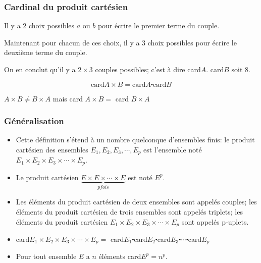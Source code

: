 \subsubsection*{Cardinal du produit cartésien }
Il y a 2 choix possibles $ a$ ou  $ b$ pour écrire le premier terme du couple. 

\begin{center}
\end{center}
Maintenant pour chacun de ces choix, il y a 3 choix possibles pour écrire le deuxième terme du couple.

\begin{center}
\end{center}

On en conclut qu'il y a $ 2 \times 3 $ couples possibles; c'est à dire  card$ A$.  card$ B $ soit 8.
\begin{theorem}
\[\textrm{card} A\times B = \textrm{card}A \centerdot \textrm{card}B  \]
\end{theorem}
\begin{remark}
$ A \times B \neq B \times A $ mais card $ A\times B =$ card $ B\times A $
\end{remark}

\subsubsection*{Généralisation}
\begin{itemize}
 \item[\textbullet]  Cette définition s'étend à un nombre quelconque d'ensembles finis:  le produit cartésien des ensembles $ E_{1}, E_{2}, E_{3}, \cdots ,E_{p} $ est  l'ensemble noté\\ $ E_{1}\times E_{2}\times E_{3}\times \cdots \times E_{p} $.
 \item[\textbullet] Le produit cartésien $\underbrace{  E\times E \times \cdots \times E}_{p fois} $   est noté $ E^{p} $.
 \item[\textbullet] Les éléments du  produit cartésien  de deux ensembles sont appelés couples; les éléments du  produit cartésien  de trois ensembles sont appelés triplets; les éléments du  produit cartésien $ E_{1}\times E_{2}\times E_{3}\times \cdots \times E_{p} $  sont appelés p-uplets.
 \item[\textbullet] card$ E_{1}\times E_{2}\times E_{3}\times \cdots \times E_{p}= $ card$ E_{1}\centerdot $card$ E_{2}\centerdot $card$ E_{3}\centerdot \cdots \centerdot $card$ E_{p} $
 \item[\textbullet] Pour tout ensemble $ E $ a $ n $ éléments  card$E^{p}=n^{p}$.
\end{itemize}

